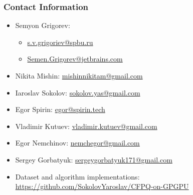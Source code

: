 \documentclass[xcolor=table]{beamer}
\begin{document}
\begin{frame}
\frametitle{Contact Information}
\begin{itemize}
  \item Semyon Grigorev:
    \begin{itemize}
      \item \href{mailto:s.v.grigoriev@spbu.ru}{s.v.grigoriev@spbu.ru}
      \item \href{mailto:Semen.Grigorev@jetbrains.com}{Semen.Grigorev@jetbrains.com}
    \end{itemize}
  \item Nikita Mishin: \href{mailto:mishinnikitam@gmail.com}{mishinnikitam@gmail.com}
  \item Iaroslav Sokolov: \href{mailto:sokolov.yas@gmail.com}{sokolov.yas@gmail.com}
  \item Egor Spirin: \href{mailto:egor@spirin.tech}{egor@spirin.tech}
  \item Vladimir Kutuev: \href{mailto:vladimir.kutuev@gmail.com}{vladimir.kutuev@gmail.com}
  \item Egor Nemchinov: \href{mailto:nemchegor@gmail.com}{nemchegor@gmail.com}
  \item Sergey Gorbatyuk: \href{mailto:sergeygorbatyuk171@gmail.com}{sergeygorbatyuk171@gmail.com}
\vspace{0.5cm}
  \item Dataset and algorithm implementations: \href{https://github.com/SokolovYaroslav/CFPQ-on-GPGPU}{https://github.com/SokolovYaroslav/CFPQ-on-GPGPU}
\end{itemize}
\vspace{0.1cm}
\end{frame}
\end{document}
